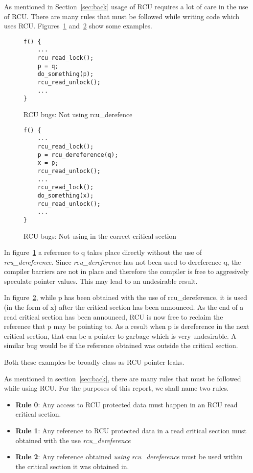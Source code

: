 As mentioned in Section~\ref{sec:back} usage of RCU requires a lot of care in
the use of RCU. There are many rules that must be followed while writing code
which uses RCU. Figures~\ref{fig:rcuderefbug} and~\ref{fig:rcuusebug} show
some examples.

\begin{figure}[h]
\centering
\begin{lstlisting}
f() {
	...
	rcu_read_lock();
	p = q;
	do_something(p);
	rcu_read_unlock();
	...
}
\end{lstlisting}
\caption{RCU bugs: Not using rcu\_derefence}\label{fig:rcuderefbug}
\end{figure}

\begin{figure}[h]
\centering
\begin{lstlisting}
f() {
	...
	rcu_read_lock();
	p = rcu_dereference(q);
	x = p;
	rcu_read_unlock();
	...
	rcu_read_lock();
	do_something(x);
	rcu_read_unlock();
	...
}
\end{lstlisting}
\caption{RCU bugs: Not using in the correct critical section}\label{fig:rcuusebug}
\end{figure}

In figure~\ref{fig:rcuderefbug} a reference to q takes place directly without the use
of \emph{rcu\_dereference}. Since \emph{rcu\_dereference} has not been used to
dereference q, the compiler barriers are not in place and therefore the compiler
is free to aggresively speculate pointer values. This may lead to an undesirable
result.

In figure~\ref{fig:rcuusebug}, while p has been obtained with the
use of rcu\_dereference, it is used (in the form of x) after the critical section
has been announced. As the end of a read critical section has been announced,
RCU is now free to reclaim the reference that p may be pointing to. As a result
when p is dereference in the next critical section, that can be a pointer to
garbage which is very undesirable.  A similar bug would be if the reference
obtained was outside the critical section.

Both these examples be broadly class as RCU pointer leaks.

As mentioned in section~\ref{sec:back}, there are many rules that must be followed
while using RCU. For the purposes of this report, we shall name two rules.
\begin{itemize}
\item{\bf Rule 0}: Any access to RCU protected data must happen in an RCU read critical section.
\item{\bf Rule 1}: Any reference to RCU protected data in a read critical section must obtained with the use \emph{rcu\_dereference}
\item{\bf Rule 2}: Any reference obtained \emph{using rcu\_dereference} must be used within the critical section it was obtained in.
\end{itemize}

